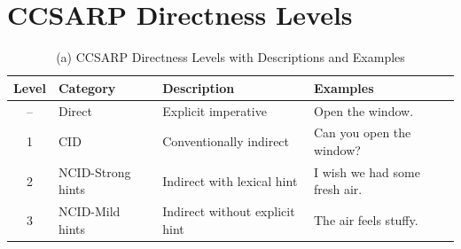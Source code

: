 \documentclass[11pt]{article}
\begin{document}






\clearpage
\appendix
\onecolumn

\section{CCSARP Directness Levels}
\label{sec:appendix-ccsarp}


\vspace{-10pt}
\begin{table}[h]
\centering
\begin{tabularx}{\textwidth}{c l l X}
\toprule
\textbf{Level} & \textbf{Category} & \textbf{Description} & \textbf{Examples} \\
\midrule

-- & Direct & Explicit imperative & Open the window. \\

1 & CID & Conventionally indirect & Can you open the window? \\

2 & NCID-Strong hints & Indirect with lexical hint & I wish we had some fresh air. \\

3 & NCID-Mild hints & Indirect without explicit hint & The air feels stuffy. \\

\bottomrule
\end{tabularx}

\caption{(a) CCSARP Directness Levels with Descriptions and Examples}
\label{tab:ccsarp_full}
\end{table}

\vspace{-2pt}
\end{document}
